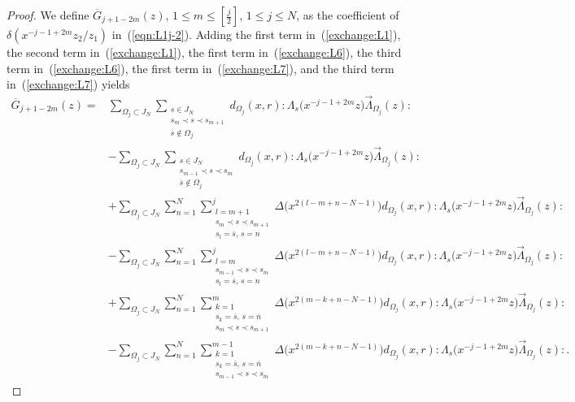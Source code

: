 \documentclass[10pt,a4paper]{amsart}
\numberwithin{equation}{section}
\begin{document}
\begin{proof}
We define $\overline{G}_{j+1-2m}(z)$, $1\leq m \leq [\frac{j}{2}]$, $1\leq j \leq N$,
as the coefficient of $\delta(x^{-j-1+2m}z_2/z_1)$ in~(\ref{eqn:L1j-2}).
Adding the first term in~(\ref{exchange:L1}), the second term in~(\ref{exchange:L1}),
the first term in~(\ref{exchange:L6}), the third term in~(\ref{exchange:L6}),
the first term in~(\ref{exchange:L7}),
and the third term in~(\ref{exchange:L7}) yields
\begin{align*}
\overline{G}_{j+1-2m}(z)={}&\sum_{\Omega_j \subset J_N}
\sum_{\substack{s\in J_N\\s_m \prec s \prec s_{m+1}
\\ \overline{s} \notin \Omega_j}}d_{\Omega_j}(x,r)
{:}\Lambda_s\big(x^{-j-1+2m}z\big)\overrightarrow{\Lambda}_{\Omega_j}(z){:}
\\
&-\sum_{\Omega_j \subset J_N}\sum_{\substack{s\in J_N
\\s_{m-1} \prec s \prec s_{m}\\ \overline{s} \notin \Omega_j}}d_{\Omega_j}(x,r)
{:}\Lambda_s\big(x^{-j-1+2m}z\big)\overrightarrow{\Lambda}_{\Omega_j}(z){:}
\\
&+\sum_{\Omega_j \subset J_N}\sum_{n=1}^N\sum_{\substack{l=m+1
\\s_m \prec s \prec s_{m+1}\\s_l=\overline{s},\, s=n}}^j\!\!\!
\Delta\big(x^{2(l-m+n-N-1)}\big) d_{\Omega_j}(x,r)
{:}\Lambda_s\big(x^{-j-1+2m}z\big)\overrightarrow{\Lambda}_{\Omega_j}(z){:}
\\
&-\sum_{\Omega_j \subset J_N}\sum_{n=1}^N\sum_{\substack{l=m
\\s_{m-1} \prec s \prec s_{m}\\s_l=\overline{s},\, s=n}}^j\!\!\!
\Delta\big(x^{2(l-m+n-N-1)}\big) d_{\Omega_j}(x,r)
{:}\Lambda_s\big(x^{-j-1+2m}z\big)\overrightarrow{\Lambda}_{\Omega_j}(z){:}
\\
&+\sum_{\Omega_j \subset J_N}\sum_{n=1}^N\sum_{\substack{k=1
\\s_k=\overline{s},\, s=\overline{n}\\s_m \prec s \prec s_{m+1}}}^m\!\!\!
\Delta\big(x^{2(m-k+n-N-1)}\big) d_{\Omega_j}(x,r)
{:}\Lambda_s\big(x^{-j-1+2m}z\big)\overrightarrow{\Lambda}_{\Omega_j}(z){:}
\\
&-\sum_{\Omega_j \subset J_N}\sum_{n=1}^N\!\sum_{\substack{k=1
\\s_k=\overline{s},\, s=\overline{n}
\\s_{m-1} \prec s \prec s_{m}}}^{m-1}\!\!\!
\Delta\big(x^{2(m-k+n-N-1)}\big) d_{\Omega_j}(x,r)
{:}\Lambda_s\big(x^{-j-1+2m}z\big)\overrightarrow{\Lambda}_{\Omega_j}(z){:}.

\end{align*}
\end{proof}
\end{document}
